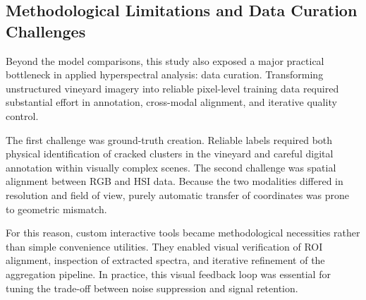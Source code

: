 

\subsection{Methodological Limitations and Data Curation Challenges}
\noindent
Beyond the model comparisons, this study also exposed a major practical bottleneck in applied hyperspectral analysis: data curation. Transforming unstructured vineyard imagery into reliable pixel-level training data required substantial effort in annotation, cross-modal alignment, and iterative quality control.

\medskip\noindent
The first challenge was ground-truth creation. Reliable labels required both physical identification of cracked clusters in the vineyard and careful digital annotation within visually complex scenes. The second challenge was spatial alignment between RGB and HSI data. Because the two modalities differed in resolution and field of view, purely automatic transfer of coordinates was prone to geometric mismatch.

\medskip\noindent
For this reason, custom interactive tools became methodological necessities rather than simple convenience utilities. They enabled visual verification of ROI alignment, inspection of extracted spectra, and iterative refinement of the aggregation pipeline. In practice, this visual feedback loop was essential for tuning the trade-off between noise suppression and signal retention.

